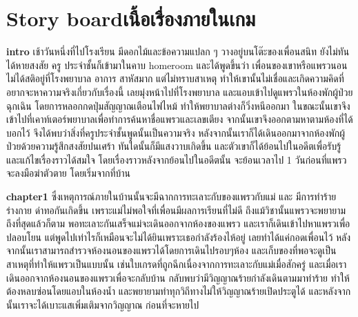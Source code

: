 \section{\ifenglish Story board\else เนื้อเรื่องภายในเกม\fi}

\textbf{intro}
เช้าวันหนึ่งที่ไปโรงเรียน มีดอกไม้และข้อความแปลก ๆ วางอยู่บนโต๊ะของเพื่อนสนิท ยังไม่ทันได้หายสงสัย ครู
ประจําชั้นก็เข้ามาในคาบ homeroom และได้พูดขึ้นว่า เพื่อนของเขาหรือแพรวนอนไม่ได้สติอยู่ที่โรงพยาบาล อาการ
สาหัสมาก แต่ไม่ทราบสาเหตุ ทําให้เขานั้นไม่เชื่อและเกิดความคิดที่อยากจะหาความจริงเกี่ยวกับเรื่องนี้ เลยมุ่งหน้าไปที่โรงพยาบาล และแอบเข้าไปดูแพรวในห้องพักผู้ป่วยฉุกเฉิน โดยการหลอกกดปุ่มสัญญาณเตือนไฟไหม้ ทำให้พยาบาลต่างก็วิ่งหนีออกมา ในขณะนั้นเขาจึงเข้าไปที่เคาท์เตอร์พยาบาลเพื่อทำการค้นหาชื่อแพรวและเลขเตียง จากนั้นเขาจึงออกตามหาตามห้องที่ได้บอกไว้ จึงได้พบว่าสิ่งที่ครูประจําชั้นพูดนั้นเป็นความจริง หลังจากนั้นเราก็ได้เดินออกมาจากห้องพักผู้ป่วยด้วยความรู้สึกสงสัยปนเศร้า ทันใดนั้นก็มีแสงวาบเกิดขึ้น และตัวเขาก็ได้ย้อนไปในอดีตเพื่อรับรู้และแก้ไขเรื่องราวได้สมใจ โดยเรื่องราวหลังจากย้อนไปในอดีตนั้น จะย้อนเวลาไป 1 วันก่อนที่แพรวจะลงมือฆ่าตัวตาย โดยเริ่มจากที่บ้าน

\textbf{chapter1}
ซึ่งเหตุการณ์ภายในบ้านนั้นจะมีฉากการทะเลาะกับของแพรวกับแม่ และ มีการทำร้ายร่างกาย ด่าทอกันเกิดขึ้น เพราะแม่ไม่พอใจที่เพื่อนมีผลการเรียนที่ไม่ดี ถึงแม้วิชานั้นแพรวจะพยายามถึงที่สุดแล้วก็ตาม
พอทะเลาะกันเสร็จแม่จะเดินออกจากห้องของแพรว และเราก็เดินเข้าไปหาแพรวเพื่อปลอบโยน แต่พูดไปเท่าไรก็เหมือนจะไม่ได้ยินเพราะเธอกำลังร้องไห้อยู่ เลยทำได้แค่กอดเพื่อนไว้ หลังจากนั้นเราสามารถสำรวจห้องนอนของแพรวได้โดยการเดินไปรอบๆห้อง และเก็บของที่พอจะดูเป็นสาเหตุที่ทำให้แพรวเป็นแบบนั้น เช่นใบเกรดที่ถูกฉีกเนื่องจากการทะเลาะกับแม่เมื่อสักครู่ และเมื่อเราเดินออกจากห้องนอนของแพรวเพื่อจะกลับบ้าน กลับพบว่ามีวิญญาณร้ายกำลังเดินตามมาทำร้าย ทำให้ต้องหลบซ่อนโดยแอบในห้องน้ำ และพยายามทำทุกวิถีทางไม่ให้วิญญาณร้ายเปิดประตูได้ และหลังจากนั้นเราจะได้เบาะแสเพิ่มเติมจากวิญญาณ ก่อนที่จะหายไป

